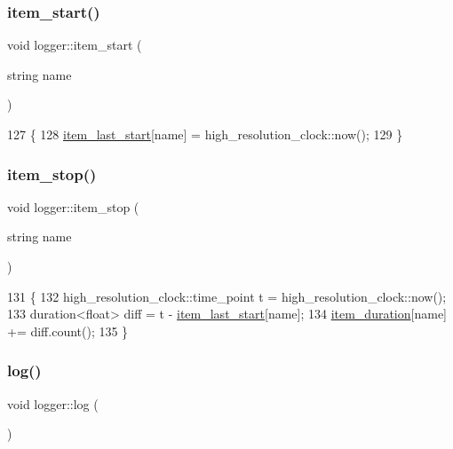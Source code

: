 \subsubsection{\texorpdfstring{item\+\_\+start()}{item\_start()}}
{\footnotesize\ttfamily void logger\+::item\+\_\+start (\begin{DoxyParamCaption}\item[{string}]{name }\end{DoxyParamCaption})\hspace{0.3cm}{\ttfamily [static]}}


\begin{DoxyCode}
127                                   \{
128   \hyperlink{classlogger_af21bf7ca37e55cf225b282ab2f312c95}{item\_last\_start}[name] = high\_resolution\_clock::now();
129 \}
\end{DoxyCode}
\mbox{\label{classlogger_a6775fee9681c437fc9c05d71cfbbe4a2}} 
\subsubsection{\texorpdfstring{item\+\_\+stop()}{item\_stop()}}
{\footnotesize\ttfamily void logger\+::item\+\_\+stop (\begin{DoxyParamCaption}\item[{string}]{name }\end{DoxyParamCaption})\hspace{0.3cm}{\ttfamily [static]}}


\begin{DoxyCode}
131                                  \{
132   high\_resolution\_clock::time\_point t = high\_resolution\_clock::now();
133   duration<float> diff = t - \hyperlink{classlogger_af21bf7ca37e55cf225b282ab2f312c95}{item\_last\_start}[name];
134   \hyperlink{classlogger_a8097637b66086185096030c96a1189ba}{item\_duration}[name] += diff.count();
135 \}
\end{DoxyCode}
\mbox{\label{classlogger_ab518e6d927694bb7329e933fa75c27bf}} 
\subsubsection{\texorpdfstring{log()}{log()}}
{\footnotesize\ttfamily void logger\+::log (\begin{DoxyParamCaption}{ }\end{DoxyParamCaption})\hspace{0.3cm}{\ttfamily [static]}}


